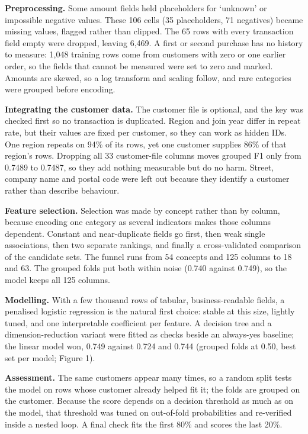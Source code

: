 \documentclass[11pt,a4paper]{article}
\newcommand{\lead}[1]{\textbf{#1.}\space}
\begin{document}
\lead{Preprocessing} Some amount fields held placeholders for `unknown' or impossible negative values. These
106 cells (35 placeholders, 71 negatives) became missing values, flagged rather than clipped.
The 65 rows with every transaction field empty were dropped, leaving 6,469. A first or second purchase has no
history to measure: 1{,}048 training rows come from customers with zero or one earlier order, so the fields that cannot
be measured were set to zero and marked.
Amounts are skewed, so a log transform and scaling follow, and rare categories were grouped before encoding.

\lead{Integrating the customer data} The customer file is optional, and the key was checked first so no
transaction is duplicated. Region and join year differ in repeat rate, but their values are fixed per customer,
so they can work as hidden IDs. One region repeats on 94\% of its rows, yet one customer supplies 86\% of that
region's rows. Dropping all 33 customer-file columns moves grouped F1 only from 0.7489 to 0.7487, so they add
nothing measurable but do no harm. Street, company name and postal code were left out because they identify a
customer rather than describe behaviour.

\lead{Feature selection} Selection was made by concept rather than by column, because encoding one category as
several indicators makes those columns dependent. Constant and near-duplicate fields go first, then weak single
associations, then two separate rankings, and finally a cross-validated comparison of the candidate sets. The
funnel runs from 54 concepts and 125 columns to 18 and 63. The grouped folds put both within noise (0.740
against 0.749), so the model keeps all 125 columns.

\lead{Modelling} With a few thousand rows of tabular, business-readable fields, a penalised logistic regression
is the natural first choice: stable at this size, lightly tuned, and one interpretable coefficient per feature.
A decision tree and a dimension-reduction variant were fitted as checks beside an always-yes baseline; the linear
model won, 0.749 against 0.724 and 0.744 (grouped folds at 0.50, best set per model; Figure 1).

\lead{Assessment} The same customers appear many times, so a random split tests the model on rows whose customer
already helped fit it; the folds are grouped on the customer. Because the score depends on a decision threshold
as much as on the model, that threshold was tuned on out-of-fold probabilities and re-verified inside a nested
loop. A final check fits the first 80\% and scores the last 20\%.
\end{document}
